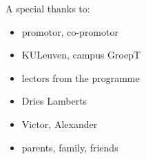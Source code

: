 A special thanks to:
\begin{itemize}
\item promotor, co-promotor 
\item KULeuven, campus GroepT
\item lectors from the programme
\item Dries Lamberts
\item Victor, Alexander
\item parents, family, friends
\end{itemize}